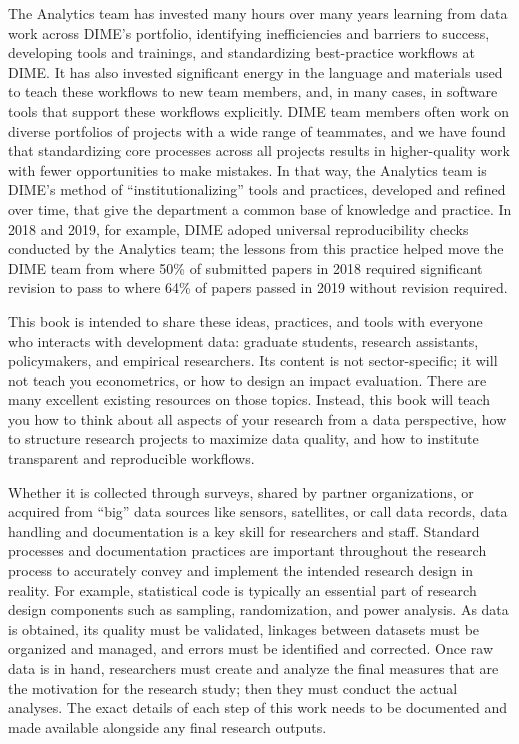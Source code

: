 The Analytics team has invested many hours over many years
learning from data work across DIME's portfolio,
identifying inefficiencies and barriers to success,
developing tools and trainings, and standardizing best-practice workflows at DIME.
It has also invested significant energy in the language and materials
used to teach these workflows to new team members,
and, in many cases, in software tools that support these workflows explicitly.
DIME team members often work on diverse portfolios of projects
with a wide range of teammates, and we have found
that standardizing core processes across all projects
results in higher-quality work with fewer opportunities to make mistakes.
In that way, the Analytics team is DIME's method of ``institutionalizing''
tools and practices, developed and refined over time,
that give the department a common base of knowledge and practice.
In 2018 and 2019, for example, DIME adoped universal reproducibility checks
conducted by the Analytics team;
the lessons from this practice helped move the DIME team
from where 50\% of submitted papers in 2018
required significant revision to pass
to where 64\% of papers passed in 2019 without revision required.

This book is intended to share these ideas, practices, and tools
with everyone who interacts with development data:
graduate students, research assistants, policymakers, and empirical researchers.
Its content is not sector-specific;
it will not teach you econometrics,
or how to design an impact evaluation.
There are many excellent existing resources on those topics.
Instead, this book will teach you how to think about all aspects of your research from a data perspective,
how to structure research projects to maximize data quality,
and how to institute transparent and reproducible workflows.

Whether it is collected through surveys, shared by partner organizations,
or acquired from ``big'' data sources like sensors, satellites, or call data records,
data handling and documentation is a key skill for researchers and staff.
Standard processes and documentation practices
are important throughout the research process to accurately convey and implement the intended research design in reality.\cite{vilhuber_lars_2020_3911311}
For example, statistical code is typically an essential part of
research design components such as sampling, randomization, and power analysis.
As data is obtained, its quality must be validated,
linkages between datasets must be organized and managed,
and errors must be identified and corrected.
Once raw data is in hand, researchers must create and analyze the final measures that
are the motivation for the research study;
then they must conduct the actual analyses.
The exact details of each step of this work needs to be documented and made available
alongside any final research outputs.

